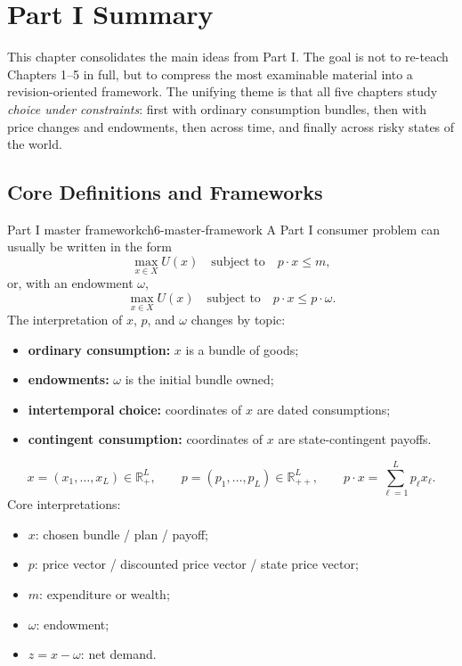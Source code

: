 
\section{Part I Summary}

This chapter consolidates the main ideas from Part I. The goal is not to re-teach Chapters 1--5 in full, but to compress the most examinable material into a revision-oriented framework. The unifying theme is that all five chapters study \emph{choice under constraints}: first with ordinary consumption bundles, then with price changes and endowments, then across time, and finally across risky states of the world.

\subsection{Core Definitions and Frameworks}

\begin{definition}{Part I master framework}{ch6-master-framework}
A Part I consumer problem can usually be written in the form
\[
\max_{x \in X} U(x)
\quad \text{subject to} \quad
p \cdot x \le m,
\]
or, with an endowment $\omega$,
\[
\max_{x \in X} U(x)
\quad \text{subject to} \quad
p \cdot x \le p \cdot \omega.
\]
The interpretation of $x$, $p$, and $\omega$ changes by topic:
\begin{itemize}
    \item \textbf{ordinary consumption:} $x$ is a bundle of goods;
    \item \textbf{endowments:} $\omega$ is the initial bundle owned;
    \item \textbf{intertemporal choice:} coordinates of $x$ are dated consumptions;
    \item \textbf{contingent consumption:} coordinates of $x$ are state-contingent payoffs.
\end{itemize}
\end{definition}

\begin{keyformula}[title={Key Formula: Part I notation map}]
\[
x=(x_1,\dots,x_L)\in \mathbb{R}_+^L,
\qquad
p=(p_1,\dots,p_L)\in \mathbb{R}_{++}^L,
\qquad
p\cdot x=\sum_{\ell=1}^L p_\ell x_\ell.
\]
Core interpretations:
\begin{itemize}
    \item $x$: chosen bundle / plan / payoff;
    \item $p$: price vector / discounted price vector / state price vector;
    \item $m$: expenditure or wealth;
    \item $\omega$: endowment;
    \item $z=x-\omega$: net demand.
\end{itemize}
\end{keyformula}

